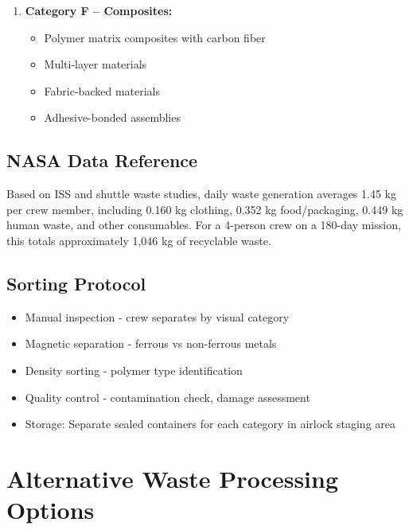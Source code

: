 \documentclass[12pt, a4paper]{article}
\begin{document}
\begin{enumerate}
    \item \textbf{Category F -- Composites:}
    \begin{itemize}
        \item Polymer matrix composites with carbon fiber
        \item Multi-layer materials
        \item Fabric-backed materials
        \item Adhesive-bonded assemblies
    \end{itemize}
\end{enumerate}

\subsection{NASA Data Reference}
Based on ISS and shuttle waste studies, daily waste generation averages 1.45 kg per crew member, including 0.160 kg clothing, 0.352 kg food/packaging, 0.449 kg human waste, and other consumables. For a 4-person crew on a 180-day mission, this totals approximately 1,046 kg of recyclable waste.

\subsection{Sorting Protocol}
\begin{itemize}
    \item Manual inspection - crew separates by visual category
    \item Magnetic separation - ferrous vs non-ferrous metals
    \item Density sorting - polymer type identification
    \item Quality control - contamination check, damage assessment
    \item Storage: Separate sealed containers for each category in airlock staging area
\end{itemize}

\section{Alternative Waste Processing Options}
\end{document}

